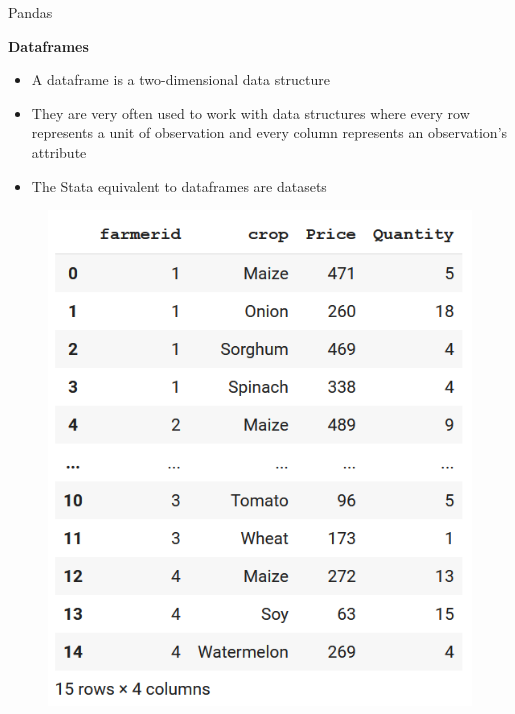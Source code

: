 \documentclass[aspectratio=169]{beamer}
\begin{document}
\begin{frame}{Pandas}

	\textbf{Dataframes}

	\begin{multicols}{2}
	
		\begin{itemize}
			\item A dataframe is a two-dimensional data structure
			\item They are very often used to work with data structures where every row represents a unit of observation and every column represents an observation's attribute
			\item The Stata equivalent to dataframes are datasets
		\end{itemize}
		\begin{figure}
			\centering
			\includegraphics[width=0.8\linewidth]{img/dataframe.png}
		\end{figure}

	\end{multicols}

\end{frame}
\end{document}
